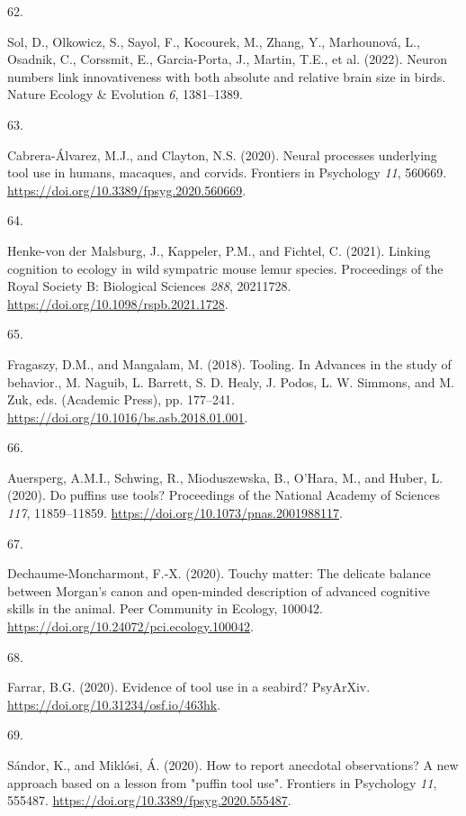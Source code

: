 \documentclass[
  man, donotrepeattitle,floatsintext]{apa6}
\newlength{\cslhangindent}
\newlength{\csllabelwidth}
\newlength{\cslentryspacingunit} %
\newenvironment{CSLReferences}[2] %
 {%
  \setlength{\parindent}{0pt}
  \ifodd #1
  \let\oldpar\par
  \def\par{\hangindent=\cslhangindent\oldpar}
  \fi
  \setlength{\parskip}{#2\cslentryspacingunit}
 }%
 {}
\newcommand{\CSLLeftMargin}[1]{\parbox[t]{\csllabelwidth}{#1}}
\newcommand{\CSLRightInline}[1]{\parbox[t]{\linewidth - \csllabelwidth}{#1}\break}
\begin{document}
\begin{CSLReferences}{0}{0}
\leavevmode{}%
\CSLLeftMargin{62. }%
\CSLRightInline{Sol, D., Olkowicz, S., Sayol, F., Kocourek, M., Zhang, Y., Marhounová, L., Osadnik, C., Corssmit, E., Garcia-Porta, J., Martin, T.E., et al. (2022). Neuron numbers link innovativeness with both absolute and relative brain size in birds. Nature Ecology \& Evolution \emph{6}, 1381--1389.}

\leavevmode{}%
\CSLLeftMargin{63. }%
\CSLRightInline{Cabrera-Álvarez, M.J., and Clayton, N.S. (2020). Neural processes underlying tool use in humans, macaques, and corvids. Frontiers in Psychology \emph{11}, 560669. \url{https://doi.org/10.3389/fpsyg.2020.560669}.}

\leavevmode{}%
\CSLLeftMargin{64. }%
\CSLRightInline{Henke-von der Malsburg, J., Kappeler, P.M., and Fichtel, C. (2021). Linking cognition to ecology in wild sympatric mouse lemur species. Proceedings of the Royal Society B: Biological Sciences \emph{288}, 20211728. \url{https://doi.org/10.1098/rspb.2021.1728}.}

\leavevmode{}%
\CSLLeftMargin{65. }%
\CSLRightInline{Fragaszy, D.M., and Mangalam, M. (2018). Tooling. In Advances in the study of behavior., M. Naguib, L. Barrett, S. D. Healy, J. Podos, L. W. Simmons, and M. Zuk, eds. (Academic Press), pp. 177--241. \url{https://doi.org/10.1016/bs.asb.2018.01.001}.}

\leavevmode{}%
\CSLLeftMargin{66. }%
\CSLRightInline{Auersperg, A.M.I., Schwing, R., Mioduszewska, B., O'Hara, M., and Huber, L. (2020). Do puffins use tools? Proceedings of the National Academy of Sciences \emph{117}, 11859--11859. \url{https://doi.org/10.1073/pnas.2001988117}.}

\leavevmode{}%
\CSLLeftMargin{67. }%
\CSLRightInline{Dechaume-Moncharmont, F.-X. (2020). Touchy matter: The delicate balance between {M}organ's canon and open-minded description of advanced cognitive skills in the animal. Peer Community in Ecology, 100042. \url{https://doi.org/10.24072/pci.ecology.100042}.}

\leavevmode{}%
\CSLLeftMargin{68. }%
\CSLRightInline{Farrar, B.G. (2020). Evidence of tool use in a seabird? PsyArXiv. \url{https://doi.org/10.31234/osf.io/463hk}.}

\leavevmode{}%
\CSLLeftMargin{69. }%
\CSLRightInline{Sándor, K., and Miklósi, Á. (2020). How to report anecdotal observations? A new approach based on a lesson from "puffin tool use". Frontiers in Psychology \emph{11}, 555487. \url{https://doi.org/10.3389/fpsyg.2020.555487}.}


\end{CSLReferences}
\end{document}
